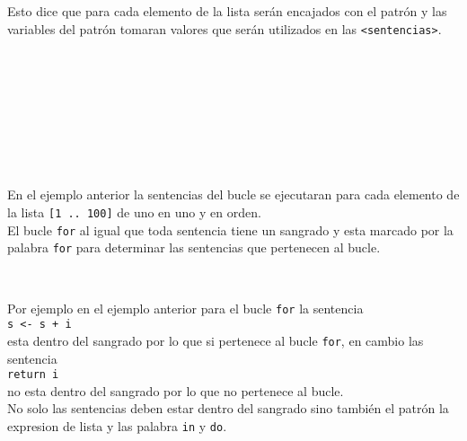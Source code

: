       Esto dice que para cada elemento de la lista serán encajados con el patrón y las variables del patrón tomaran valores que serán utilizados en las \texttt{<sentencias>}.
      
      \begin{fxcode}
         \\
         \\
         \\
         \\
         \\
         \\
         \\
      \end{fxcode}
      
      En el ejemplo anterior la sentencias del bucle se ejecutaran para cada elemento de la lista \texttt{[1 .. 100]} de uno en uno y en orden.
      \\
      
      El bucle \texttt{for} al igual que toda sentencia tiene un sangrado y esta marcado por la palabra \texttt{for} para determinar las sentencias que pertenecen al bucle.
      
      \begin{fxcode}
         \\
      \end{fxcode}
      
      Por ejemplo en el ejemplo anterior para el bucle \texttt{for} la sentencia\\
      \texttt{s <- s + i}\\
      esta dentro del sangrado por lo que si pertenece al bucle \texttt{for}, en cambio las sentencia\\
      \texttt{return i}\\
      no esta dentro del sangrado por lo que no pertenece al bucle.
      \\
      
      No solo las sentencias deben estar dentro del sangrado sino también el patrón la expresion de lista y las palabra \texttt{in} y \texttt{do}.
      

